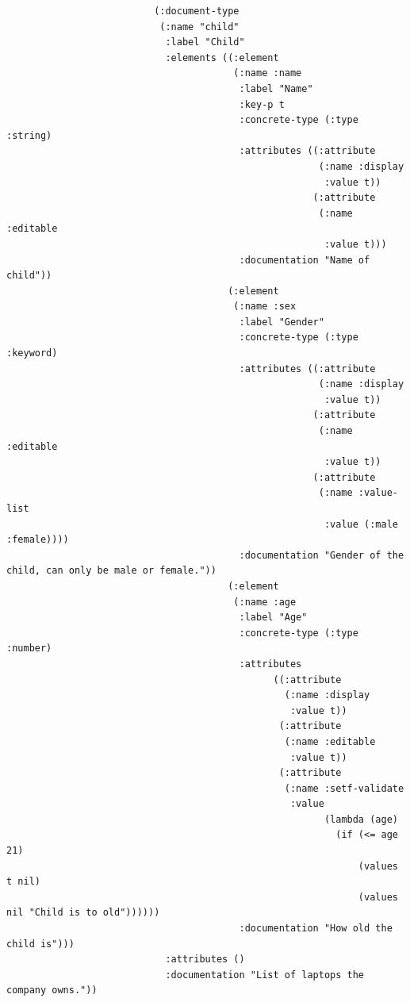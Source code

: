 \documentclass[11pt]{article}
\begin{document}
\begin{verbatim}
                          (:document-type
                           (:name "child"
                            :label "Child"
                            :elements ((:element
                                        (:name :name
                                         :label "Name"
                                         :key-p t
                                         :concrete-type (:type :string)
                                         :attributes ((:attribute
                                                       (:name :display
                                                        :value t))
                                                      (:attribute
                                                       (:name :editable
                                                        :value t)))
                                         :documentation "Name of child"))
                                       (:element
                                        (:name :sex
                                         :label "Gender"
                                         :concrete-type (:type :keyword)
                                         :attributes ((:attribute
                                                       (:name :display
                                                        :value t))
                                                      (:attribute
                                                       (:name :editable
                                                        :value t))
                                                      (:attribute
                                                       (:name :value-list
                                                        :value (:male :female))))
                                         :documentation "Gender of the child, can only be male or female."))
                                       (:element
                                        (:name :age
                                         :label "Age"
                                         :concrete-type (:type :number)
                                         :attributes
                                               ((:attribute
                                                 (:name :display
                                                  :value t))
                                                (:attribute
                                                 (:name :editable
                                                  :value t))
                                                (:attribute
                                                 (:name :setf-validate
                                                  :value
                                                        (lambda (age)
                                                          (if (<= age 21)
                                                              (values t nil)
                                                              (values nil "Child is to old"))))))
                                         :documentation "How old the child is")))
                            :attributes ()
                            :documentation "List of laptops the company owns."))


\end{verbatim}
\end{document}
